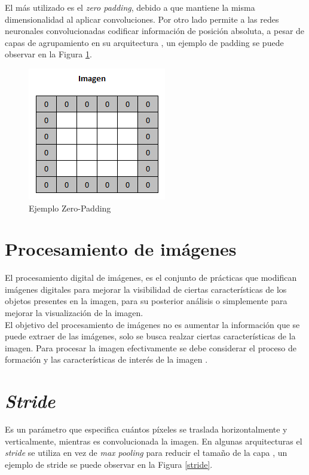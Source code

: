 El más utilizado es el \textit{zero padding}, debido a que mantiene la misma dimensionalidad al aplicar convoluciones. Por otro lado permite a las redes neuronales convolucionadas codificar información de posición absoluta, a pesar de capas de agrupamiento en su arquitectura \cite{islam2021position}, un ejemplo de padding se puede observar en la Figura \ref{padding}.

\begin{figure}[ht]
	\centering
	\includegraphics[scale=0.65]{Figs/padding.png}
	\caption{Ejemplo Zero-Padding}
	\label{padding}
\end{figure}


\newpage
\section{Procesamiento de imágenes} El procesamiento digital de imágenes, es el conjunto de prácticas que modifican imágenes digitales para mejorar la visibilidad de ciertas características de los objetos presentes en la imagen, para su posterior análisis o simplemente para mejorar la visualización de la
imagen.\\

El objetivo del procesamiento de imágenes no es aumentar la información que se puede extraer de las imágenes, solo se busca realzar ciertas características de la imagen. Para procesar la imagen efectivamente se debe considerar el proceso de formación y las características de interés de la imagen \cite{ref_13}.

 
 \section{\textit{Stride}}

 
 Es un parámetro que especifica cuántos píxeles se traslada horizontalmente y verticalmente, mientras es convolucionada la imagen. En algunas arquitecturas el \textit{stride} se utiliza en vez de \textit{max pooling} para reducir el tamaño de la capa \cite{murphy2016overview}, un ejemplo de stride se puede observar en la Figura \ref{stride}.
 
